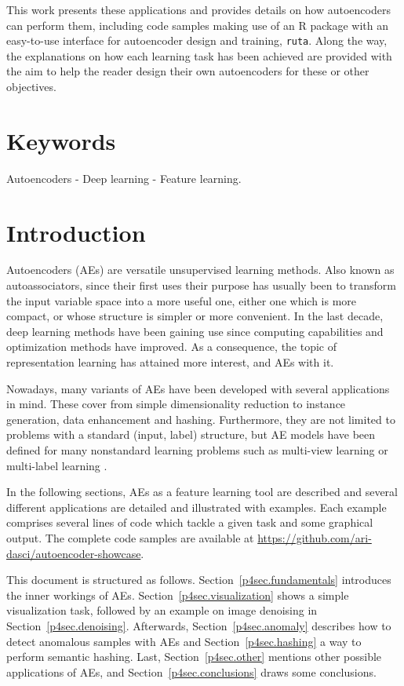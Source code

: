 This work presents these applications and provides details on how autoencoders can perform them, including code samples making use of an R package with an easy-to-use interface for autoencoder design and training, \texttt{ruta}. Along the way, the explanations on how each learning task has been achieved are provided with the aim to help the reader design their own autoencoders for these or other objectives. 

\section*{Keywords}Autoencoders - Deep learning - Feature learning.
%
%
%
\section{Introduction}

Autoencoders (AEs) \cite{hinton} are versatile unsupervised learning methods. Also known as autoassociators, since their first uses their purpose has usually been to transform the input variable space into a more useful one, either one which is more compact, or whose structure is simpler or more convenient. In the last decade, deep learning methods have been gaining use since computing capabilities and optimization methods have improved. As a consequence, the topic of representation learning \cite{bengio} has attained more interest, and AEs with it.

Nowadays, many variants of AEs \cite{charte} have been developed with several applications in mind. These cover from simple dimensionality reduction to instance generation, data enhancement and hashing. Furthermore, they are not limited to problems with a standard (input, label) structure, but AE models have been defined for many nonstandard learning problems such as multi-view learning or multi-label learning \cite{nonstandard,advcae,maniac}.

In the following sections, AEs as a feature learning tool are described and several different applications are detailed and illustrated with examples. Each example comprises several lines of code which tackle a given task and some graphical output. The complete code samples are available at \url{https://github.com/ari-dasci/autoencoder-showcase}.

This document is structured as follows. Section~\ref{p4sec.fundamentals} introduces the inner workings of AEs. Section~\ref{p4sec.visualization} shows a simple visualization task, followed by an example on image denoising in Section~\ref{p4sec.denoising}. Afterwards, Section~\ref{p4sec.anomaly} describes how to detect anomalous samples with AEs and Section~\ref{p4sec.hashing} a way to perform semantic hashing. Last, Section~\ref{p4sec.other} mentions other possible applications of AEs, and Section~\ref{p4sec.conclusions} draws some conclusions.

